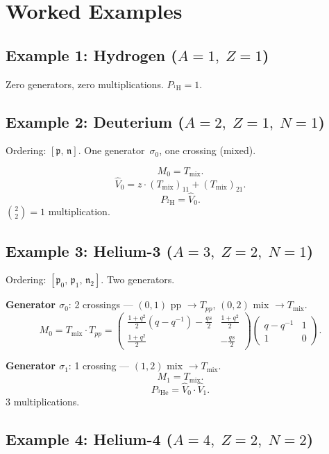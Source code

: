 \documentclass[12pt,a4paper]{article}
\begin{document}
\section{Worked Examples}

\subsection*{Example 1: Hydrogen ($A=1,\; Z=1$)}

Zero generators, zero multiplications.
$P_{{}^1\mathrm{H}} = 1$.

\subsection*{Example 2: Deuterium ($A=2,\; Z=1,\; N=1$)}

Ordering: $[\mathfrak{p},\, \mathfrak{n}]$.
One generator~$\sigma_0$, one crossing (mixed).

\[
  M_0 = T_{\mathrm{mix}}.
\]
\[
  \hat{V}_0
  = z \cdot (T_{\mathrm{mix}})_{11} + (T_{\mathrm{mix}})_{21}.
\]
\[
  P_{{}^2\mathrm{H}} = \hat{V}_0.
\]
$\binom{2}{2} = 1$ multiplication.

\subsection*{Example 3: Helium-3 ($A=3,\; Z=2,\; N=1$)}

Ordering: $[\mathfrak{p}_0,\, \mathfrak{p}_1,\, \mathfrak{n}_2]$.
Two generators.

\medskip

\noindent\textbf{Generator $\sigma_0$}: 2 crossings ---
$(0,1)$ pp $\to T_{pp}$, \;$(0,2)$ mix $\to T_{\mathrm{mix}}$.
\[
  M_0 = T_{\mathrm{mix}} \cdot T_{pp}
  = \begin{pmatrix}
      \frac{1+q^2}{2}(q-q^{-1}) - \frac{qs}{2} & \frac{1+q^2}{2} \\[4pt]
      \frac{1+q^2}{2} & -\frac{qs}{2}
    \end{pmatrix}
  \begin{pmatrix}
      q-q^{-1} & 1 \\ 1 & 0
    \end{pmatrix}.
\]

\noindent\textbf{Generator $\sigma_1$}: 1 crossing ---
$(1,2)$ mix $\to T_{\mathrm{mix}}$.
\[
  M_1 = T_{\mathrm{mix}}.
\]
\[
  P_{{}^3\mathrm{He}} = \hat{V}_0 \cdot \hat{V}_1.
\]
3 multiplications.

\subsection*{Example 4: Helium-4 ($A=4,\; Z=2,\; N=2$)}
\end{document}
